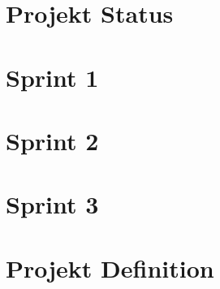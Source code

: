 \documentclass{hda/hdaConceptClass}
\begin{document}
\makesitHead



\chapter{Projekt Status
}\label{chap:status}




\newpage %


\chapter{Sprint 1
}\label{chap:kwxn}


\newpage %
\chapter{Sprint 2
}\label{chap:kwxn}



\newpage %
\chapter{Sprint 3
}\label{chap:kwxn}



\newpage
\chapter{Projekt Definition
}\label{chap:project}


\newpage


\newpage
\sitAppendix                 %
  \sitListOfTables
  \sitListOfFigures
  \sitListOfListings
  \sitListOfIdxInfos
  
\end{document}
